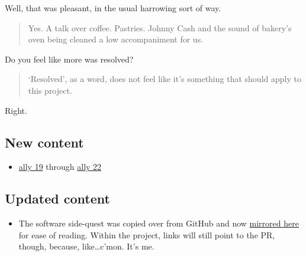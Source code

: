 Well, that was pleasant, in the usual harrowing sort of way.

\begin{quote}
Yes. A talk over coffee. Pastries. Johnny Cash and the sound of bakery's oven being cleaned a low accompaniment for us.
\end{quote}

Do you feel like more was resolved?

\begin{quote}
`Resolved', as a word, does not feel like it's something that should apply to this project.
\end{quote}

Right.

\hypertarget{new-content}{%
\subsection{New content}\label{new-content}}

\begin{itemize}
\tightlist
\item
  \href{/19}{ally 19} through \href{/22}{ally 22}
\end{itemize}

\hypertarget{updated-content}{%
\subsection{Updated content}\label{updated-content}}

\begin{itemize}
\tightlist
\item
  The software side-quest was copied over from GitHub and now \href{/writing/software}{mirrored here} for ease of reading. Within the project, links will still point to the PR, though, because, like\ldots{}c'mon. It's me.
\end{itemize}
